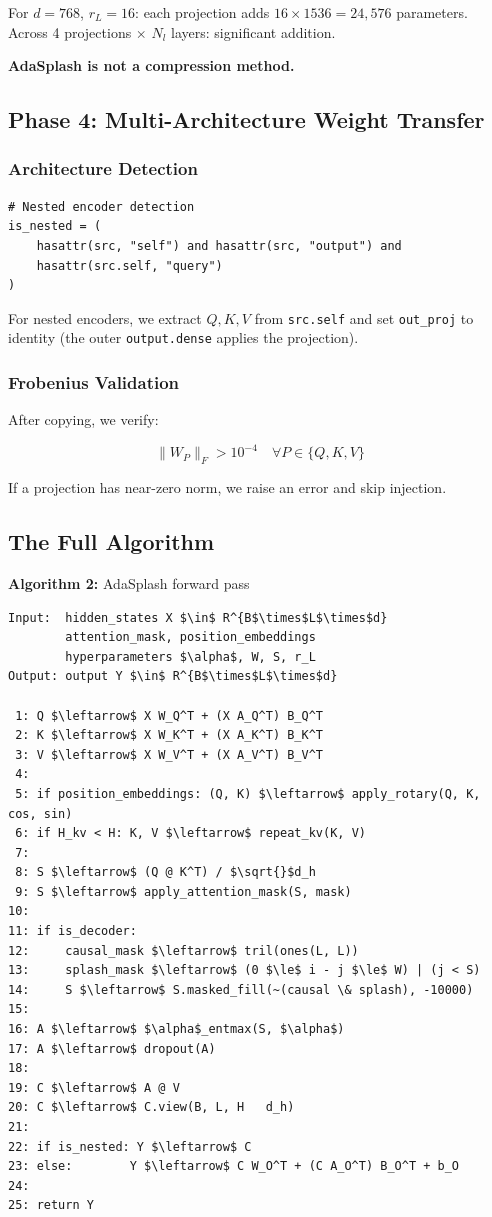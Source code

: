 For $d = 768$, $r_L = 16$: each projection adds $16 \times 1536 = 24{,}576$ 
parameters. Across 4 projections $\times$ $N_l$ layers: significant addition.

\textbf{AdaSplash is not a compression method.}

\subsection{Phase 4: Multi-Architecture Weight Transfer}

\subsubsection{Architecture Detection}

\begin{lstlisting}
# Nested encoder detection
is_nested = (
    hasattr(src, "self") and hasattr(src, "output") and
    hasattr(src.self, "query")
)
\end{lstlisting}

For nested encoders, we extract $Q, K, V$ from \texttt{src.self} and set 
\texttt{out\_proj} to identity (the outer \texttt{output.dense} applies the projection).

\subsubsection{Frobenius Validation}

After copying, we verify:

\[
\|W_P\|_F > 10^{-4} \quad \forall P \in \{Q, K, V\}
\tag{4.7}
\]

If a projection has near-zero norm, we raise an error and skip injection.

\subsection{The Full Algorithm}

\textbf{Algorithm 2:} AdaSplash forward pass
\begin{lstlisting}
Input:  hidden_states X $\in$ R^{B$\times$L$\times$d}
        attention_mask, position_embeddings
        hyperparameters $\alpha$, W, S, r_L
Output: output Y $\in$ R^{B$\times$L$\times$d}

 1: Q $\leftarrow$ X W_Q^T + (X A_Q^T) B_Q^T
 2: K $\leftarrow$ X W_K^T + (X A_K^T) B_K^T
 3: V $\leftarrow$ X W_V^T + (X A_V^T) B_V^T
 4:
 5: if position_embeddings: (Q, K) $\leftarrow$ apply_rotary(Q, K, cos, sin)
 6: if H_kv < H: K, V $\leftarrow$ repeat_kv(K, V)
 7:
 8: S $\leftarrow$ (Q @ K^T) / $\sqrt{}$d_h
 9: S $\leftarrow$ apply_attention_mask(S, mask)
10:
11: if is_decoder:
12:     causal_mask $\leftarrow$ tril(ones(L, L))
13:     splash_mask $\leftarrow$ (0 $\le$ i - j $\le$ W) | (j < S)
14:     S $\leftarrow$ S.masked_fill(~(causal \& splash), -10000)
15:
16: A $\leftarrow$ $\alpha$_entmax(S, $\alpha$)
17: A $\leftarrow$ dropout(A)
18:
19: C $\leftarrow$ A @ V
20: C $\leftarrow$ C.view(B, L, H   d_h)
21:
22: if is_nested: Y $\leftarrow$ C
23: else:        Y $\leftarrow$ C W_O^T + (C A_O^T) B_O^T + b_O
24:
25: return Y
\end{lstlisting}

